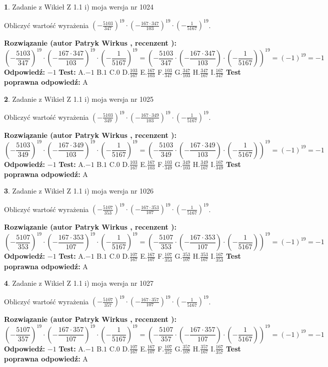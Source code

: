 \documentclass[12pt, a4paper]{article}
\theoremstyle{definition} %
\newtheorem{zad}{}
\newcommand{\zadStart}[1]{\begin{zad}#1\newline}
\newcommand{\zadStop}{\end{zad}}
\newcommand{\rozwStart}[2]{\noindent \textbf{Rozwiązanie (autor #1 , recenzent #2): }\newline}
\newcommand{\rozwStop}{\newline}
\newcommand{\odpStart}{\noindent \textbf{Odpowiedź:}\newline}
\newcommand{\odpStop}{\newline}
\newcommand{\testStart}{\noindent \textbf{Test:}\newline}
\newcommand{\testStop}{\newline}
\newcommand{\kluczStart}{\noindent \textbf{Test poprawna odpowiedź:}\newline}
\newcommand{\kluczStop}{\newline}
\begin{document}
\zadStart{Zadanie z Wikieł Z 1.1 i) moja wersja nr 1024}

Obliczyć wartość wyrażenia $(-\frac{5103}{347})^{19} \cdot (-\frac{167 \cdot 347}{103})^{19} \cdot (-\frac{1}{5167})^{19}$.
\zadStop
\rozwStart{Patryk Wirkus}{}
$$(-\frac{5103}{347})^{19} \cdot (-\frac{167 \cdot 347}{103})^{19} \cdot (-\frac{1}{5167})^{19} = (-\frac{5103}{347} \cdot (-\frac{167 \cdot 347}{103}) \cdot (-\frac{1}{5167}))^{19} = (-1)^{19} = -1$$
\rozwStop
\odpStart
$-1$
\odpStop
\testStart
A.$-1$ B.$1$ C.$0$ D.$\frac{103}{167}$ E.$\frac{167}{103}$
F.$\frac{103}{347}$ G.$\frac{347}{103}$
H.$\frac{347}{167}$
I.$\frac{167}{347}$
\testStop
\kluczStart
A
\kluczStop



\zadStart{Zadanie z Wikieł Z 1.1 i) moja wersja nr 1025}

Obliczyć wartość wyrażenia $(-\frac{5103}{349})^{19} \cdot (-\frac{167 \cdot 349}{103})^{19} \cdot (-\frac{1}{5167})^{19}$.
\zadStop
\rozwStart{Patryk Wirkus}{}
$$(-\frac{5103}{349})^{19} \cdot (-\frac{167 \cdot 349}{103})^{19} \cdot (-\frac{1}{5167})^{19} = (-\frac{5103}{349} \cdot (-\frac{167 \cdot 349}{103}) \cdot (-\frac{1}{5167}))^{19} = (-1)^{19} = -1$$
\rozwStop
\odpStart
$-1$
\odpStop
\testStart
A.$-1$ B.$1$ C.$0$ D.$\frac{103}{167}$ E.$\frac{167}{103}$
F.$\frac{103}{349}$ G.$\frac{349}{103}$
H.$\frac{349}{167}$
I.$\frac{167}{349}$
\testStop
\kluczStart
A
\kluczStop



\zadStart{Zadanie z Wikieł Z 1.1 i) moja wersja nr 1026}

Obliczyć wartość wyrażenia $(-\frac{5107}{353})^{19} \cdot (-\frac{167 \cdot 353}{107})^{19} \cdot (-\frac{1}{5167})^{19}$.
\zadStop
\rozwStart{Patryk Wirkus}{}
$$(-\frac{5107}{353})^{19} \cdot (-\frac{167 \cdot 353}{107})^{19} \cdot (-\frac{1}{5167})^{19} = (-\frac{5107}{353} \cdot (-\frac{167 \cdot 353}{107}) \cdot (-\frac{1}{5167}))^{19} = (-1)^{19} = -1$$
\rozwStop
\odpStart
$-1$
\odpStop
\testStart
A.$-1$ B.$1$ C.$0$ D.$\frac{107}{167}$ E.$\frac{167}{107}$
F.$\frac{107}{353}$ G.$\frac{353}{107}$
H.$\frac{353}{167}$
I.$\frac{167}{353}$
\testStop
\kluczStart
A
\kluczStop



\zadStart{Zadanie z Wikieł Z 1.1 i) moja wersja nr 1027}

Obliczyć wartość wyrażenia $(-\frac{5107}{357})^{19} \cdot (-\frac{167 \cdot 357}{107})^{19} \cdot (-\frac{1}{5167})^{19}$.
\zadStop
\rozwStart{Patryk Wirkus}{}
$$(-\frac{5107}{357})^{19} \cdot (-\frac{167 \cdot 357}{107})^{19} \cdot (-\frac{1}{5167})^{19} = (-\frac{5107}{357} \cdot (-\frac{167 \cdot 357}{107}) \cdot (-\frac{1}{5167}))^{19} = (-1)^{19} = -1$$
\rozwStop
\odpStart
$-1$
\odpStop
\testStart
A.$-1$ B.$1$ C.$0$ D.$\frac{107}{167}$ E.$\frac{167}{107}$
F.$\frac{107}{357}$ G.$\frac{357}{107}$
H.$\frac{357}{167}$
I.$\frac{167}{357}$
\testStop
\kluczStart
A
\kluczStop
\end{document}
